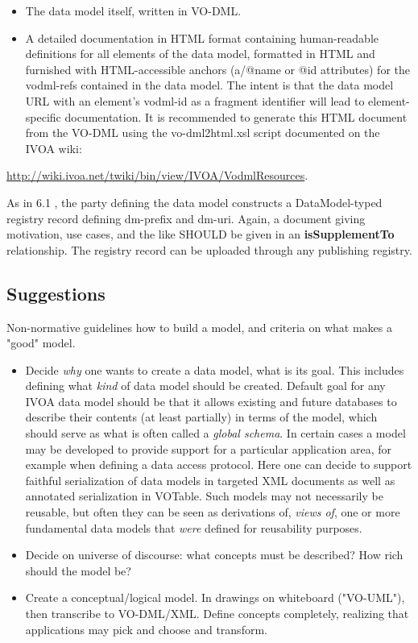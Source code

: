 \documentclass[10pt,a4paper]{ivoa}
\begin{document}
\begin{itemize}
\item
  The data model itself, written in VO-DML.
\item
  A detailed documentation in HTML format containing human-readable
  definitions for all elements of the data model, formatted in HTML and
  furnished with HTML-accessible anchors (a/@name or @id attributes) for
  the vodml-refs contained in the data model. The intent is that the
  data model URL with an element's vodml-id as a fragment identifier
  will lead to element-specific documentation. It is recommended to
  generate this HTML document from the VO-DML using the vo-dml2html.xsl
  script documented on the IVOA wiki:
\end{itemize}

\url{http://wiki.ivoa.net/twiki/bin/view/IVOA/VodmlResources}.

As in 6.1 , the party defining the data model constructs a
DataModel-typed registry record defining dm-prefix and dm-uri. Again, a
document giving motivation, use cases, and the like SHOULD be given in
an \textbf{isSupplementTo} relationship. The registry record can be
uploaded through any publishing registry.

\hypertarget{suggestions}{%
\subsection{Suggestions}\label{suggestions}}

Non-normative guidelines how to build a model, and criteria on what
makes a "good" model.

\begin{itemize}
\item
  Decide \emph{why} one wants to create a data model, what is its goal.
  This includes defining what \emph{kind} of data model should be
  created. Default goal for any IVOA data model should be that it allows
  existing and future databases to describe their contents (at least
  partially) in terms of the model, which should serve as what is often
  called a \emph{global schema}. In certain cases a model may be
  developed to provide support for a particular application area, for
  example when defining a data access protocol. Here one can decide to
  support faithful serialization of data models in targeted XML
  documents as well as annotated serialization in VOTable. Such models
  may not necessarily be reusable, but often they can be seen as
  derivations of, \emph{views of}, one or more fundamental data models
  that \emph{were} defined for reusability purposes.
\item
  Decide on universe of discourse: what concepts must be described? How
  rich should the model be?
\item
  Create a conceptual/logical model. In drawings on whiteboard
  ("VO-UML"), then transcribe to VO-DML/XML. Define concepts completely,
  realizing that applications may pick and choose and transform.
\end{itemize}
\end{document}
